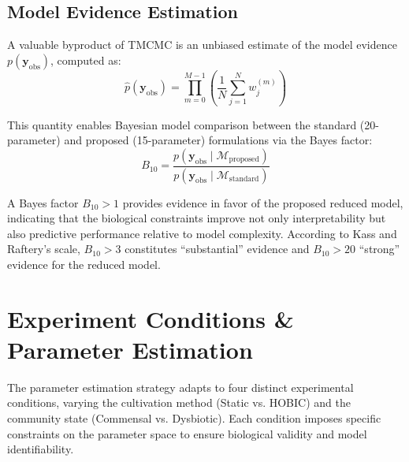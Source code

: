 \documentclass[11pt,a4paper]{article}
\begin{document}
\subsection{Model Evidence Estimation}

A valuable byproduct of TMCMC is an unbiased estimate of the model evidence $p(\mathbf{y}_{\mathrm{obs}})$, computed as:
\begin{equation}
\hat{p}(\mathbf{y}_{\mathrm{obs}}) = \prod_{m=0}^{M-1} \left(\frac{1}{N} \sum_{j=1}^{N} w_j^{(m)}\right)
\label{eq:evidence}
\end{equation}

\noindent This quantity enables Bayesian model comparison between the standard (20-parameter) and proposed (15-parameter) formulations via the Bayes factor:
\begin{equation}
B_{10} = \frac{p(\mathbf{y}_{\mathrm{obs}} \mid \mathcal{M}_{\mathrm{proposed}})}{p(\mathbf{y}_{\mathrm{obs}} \mid \mathcal{M}_{\mathrm{standard}})}
\end{equation}

\noindent A Bayes factor $B_{10} > 1$ provides evidence in favor of the proposed reduced model, indicating that the biological constraints improve not only interpretability but also predictive performance relative to model complexity. According to Kass and Raftery's scale, $B_{10} > 3$ constitutes ``substantial'' evidence and $B_{10} > 20$ ``strong'' evidence for the reduced model.

\section{Experiment Conditions \& Parameter Estimation}
\label{sec:conditions}

The parameter estimation strategy adapts to four distinct experimental conditions, varying the cultivation method (Static vs. HOBIC) and the community state (Commensal vs. Dysbiotic). Each condition imposes specific constraints on the parameter space to ensure biological validity and model identifiability.
\end{document}
